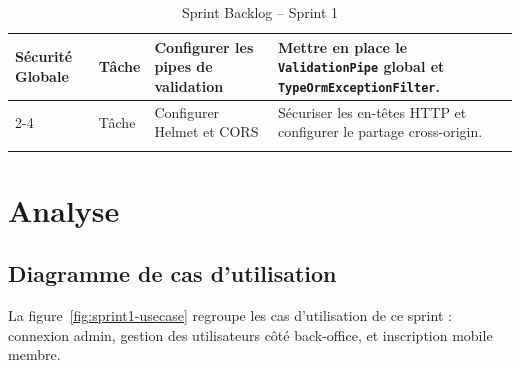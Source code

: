 ﻿\documentclass[../main.tex]{subfiles}
\begin{document}
\begin{longtable}{|p{3cm}|p{2.5cm}|p{4cm}|p{5cm}|}
\multirow{2}{3cm}{S\'{e}curit\'{e} Globale} & T\^{a}che & Configurer les pipes de validation & Mettre en place le \texttt{ValidationPipe} global et \texttt{TypeOrmExceptionFilter}. \\
\cline{2-4}
& T\^{a}che & Configurer Helmet et CORS & S\'{e}curiser les en-t\^{e}tes HTTP et configurer le partage cross-origin. \\
\hline

\caption{Sprint Backlog -- Sprint 1}
\label{tab:sprint1-backlog}
\end{longtable}

\section{Analyse}

\subsection{Diagramme de cas d'utilisation}

La figure~\ref{fig:sprint1-usecase} regroupe les cas d'utilisation de ce sprint : connexion admin, gestion des utilisateurs c\^{o}t\'{e} back-office, et inscription mobile membre.
\end{document}
